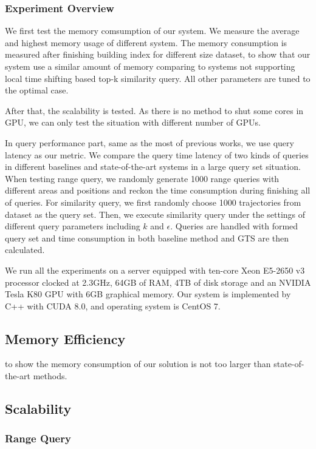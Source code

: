 \documentclass[conference]{IEEEtran}
\begin{document}
\subsubsection{Experiment Overview}

We first test the memory comsumption of our system. We measure the average and highest memory usage of different system. The memory consumption is measured after finishing building index for different size dataset, to show that our system use a similar amount of memory comparing to systems not supporting local time shifting based top-k similarity query. All other parameters are tuned to the optimal case.

After that, the scalability is tested. As there is no method to shut some cores in GPU, we can only test the situation with different number of GPUs.

In query performance part, same as the most of previous works, we use query latency as our metric. We compare the query time latency of two kinds of queries in different baselines and state-of-the-art systems in a large query set situation. When testing range query, we randomly generate 1000 range queries with different areas and positions and reckon the time consumption during finishing all of queries. For similarity query, we first randomly choose 1000 trajectories from dataset as the query set. Then, we execute similarity query under the settings of different query parameters including $k$ and $\epsilon$. Queries are handled with formed query set and time consumption in both baseline method and GTS are then calculated. 


We run all the experiments on a server equipped with ten-core Xeon E5-2650 v3 processor clocked at 2.3GHz, 64GB of RAM, 4TB of disk storage and an NVIDIA Tesla K80 GPU with 6GB graphical memory. Our system is implemented by C++ with CUDA 8.0, and operating system is CentOS 7.



\subsection{Memory Efficiency}
to show the memory consumption of our solution is not too larger than state-of-the-art methods.


\subsection{Scalability}
\subsubsection{Range Query}
\end{document}
